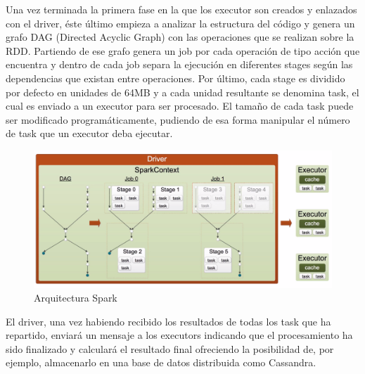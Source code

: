 Una vez terminada la primera fase en la que los executor son creados y enlazados con el driver, éste último empieza a analizar la estructura del código y genera un grafo DAG (Directed Acyclic Graph) con las operaciones que se realizan sobre la RDD. Partiendo de ese grafo genera un job por cada operación de tipo acción que encuentra y dentro de cada job separa la ejecución en diferentes stages según las dependencias que existan entre operaciones. Por último, cada stage es dividido por defecto en unidades de 64MB y a cada unidad resultante se denomina task, el cual es enviado a un executor para ser procesado. El tamaño de cada task puede ser modificado programáticamente, pudiendo de esa forma manipular el número de task que un executor deba ejecutar.\\

\begin{figure}[h]
	\centering
	\includegraphics[width=1\textwidth]{Ilustraciones/spark_task_creation.png}
	\caption{Arquitectura Spark}
	\label{fig:spark_task_creation}
\end{figure}

El driver, una vez habiendo recibido los resultados de todas los task que ha repartido, enviará un mensaje a los executors indicando que el procesamiento ha sido finalizado y calculará el resultado final ofreciendo la posibilidad de, por ejemplo, almacenarlo en una base de datos distribuida como Cassandra.\\






